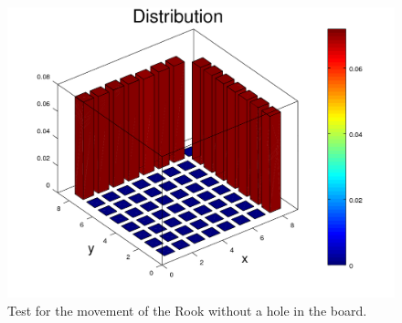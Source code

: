 \documentclass{amsart}
\numberwithin{equation}{section}
\begin{document}
\begin{figure}[!h]
\begin{minipage}{0.50\textwidth}
     \includegraphics[width=1.0\linewidth]{figures/regular/figure_Rook_moveFixedOrigin_N1000000_x8_y8.png}
     \captionsetup{labelformat=empty}
     \caption*{$n=1,000,000$}
   \end{minipage}\hfil
    \caption{Test for the movement of the Rook without a hole in the board.}
    \label{plots:graphs_testing_regular}
\end{figure}
\end{document}
